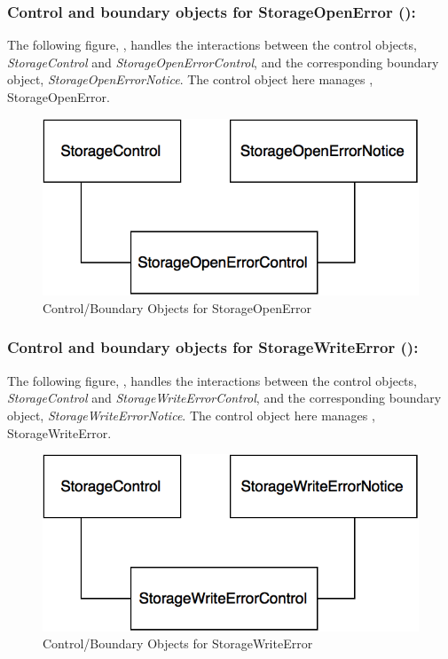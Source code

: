 \documentclass[12pt,letterpaper]{article}
\begin{document}
\subsubsection*{Control and boundary objects for StorageOpenError ():}

The following figure, , handles the interactions between the control objects, {\it StorageControl} and {\it StorageOpenErrorControl}, and the corresponding boundary object, 
{\it StorageOpenErrorNotice}. The control object here manages , StorageOpenError.

\begin{figure}[H]
	\centering{}
	\includegraphics[scale=0.37]{imgs/cbod/storage-open-error.png}
	\caption{Control/Boundary Objects for StorageOpenError}
\end{figure}

\subsubsection*{Control and boundary objects for StorageWriteError ():}

The following figure, , handles the interactions between the control objects, {\it StorageControl} and {\it StorageWriteErrorControl}, and the corresponding boundary object, {\it StorageWriteErrorNotice}. The control object here manages , StorageWriteError.

\begin{figure}[H]
	\centering{}
	\includegraphics[scale=0.37]{imgs/cbod/storage-write-error.png}
	\caption{Control/Boundary Objects for StorageWriteError}
\end{figure}
\end{document}
